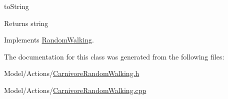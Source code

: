 to\+String \begin{DoxyReturn}{Returns}
string 
\end{DoxyReturn}


Implements \hyperlink{class_random_walking_a86f089cc5cc28d179e248c67477e8b30}{Random\+Walking}.



The documentation for this class was generated from the following files\+:\begin{DoxyCompactItemize}
\item 
Model/\+Actions/\hyperlink{_carnivore_random_walking_8h}{Carnivore\+Random\+Walking.\+h}\item 
Model/\+Actions/\hyperlink{_carnivore_random_walking_8cpp}{Carnivore\+Random\+Walking.\+cpp}\end{DoxyCompactItemize}
